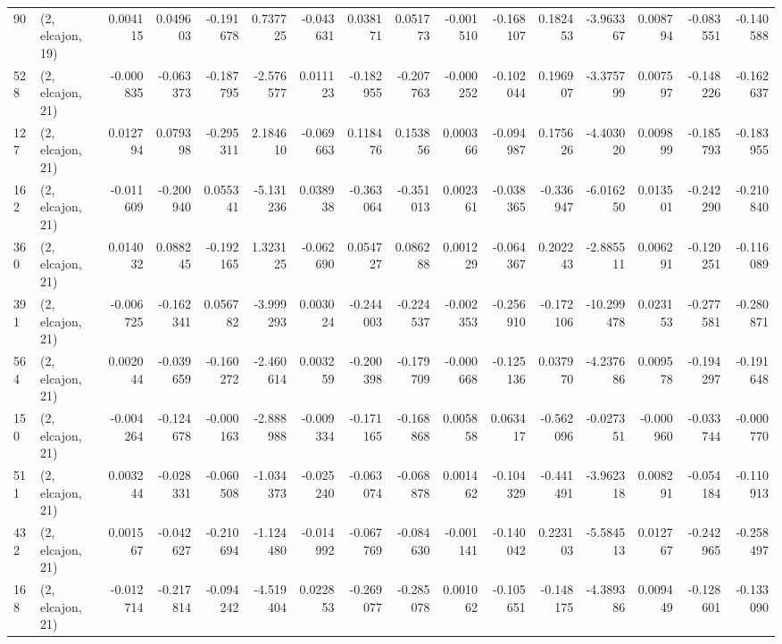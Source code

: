 \begin{tabular}{llrrrrrrrrrrrrrr}
90  &  (2, elcajon, 19) &   0.004115 &  0.049603 & -0.191678 &    0.737725 & -0.043631 &   0.038171 &  0.051773 & -0.001510 & -0.168107 &  0.182453 &   -3.963367 &  0.008794 & -0.083551 & -0.140588 \\
528 &  (2, elcajon, 21) &  -0.000835 & -0.063373 & -0.187795 &   -2.576577 &  0.011123 &  -0.182955 & -0.207763 & -0.000252 & -0.102044 &  0.196907 &   -3.375799 &  0.007597 & -0.148226 & -0.162637 \\
127 &  (2, elcajon, 21) &   0.012794 &  0.079398 & -0.295311 &    2.184610 & -0.069663 &   0.118476 &  0.153856 &  0.000366 & -0.094987 &  0.175626 &   -4.403020 &  0.009899 & -0.185793 & -0.183955 \\
162 &  (2, elcajon, 21) &  -0.011609 & -0.200940 &  0.055341 &   -5.131236 &  0.038938 &  -0.363064 & -0.351013 &  0.002361 & -0.038365 & -0.336947 &   -6.016250 &  0.013501 & -0.242290 & -0.210840 \\
360 &  (2, elcajon, 21) &   0.014032 &  0.088245 & -0.192165 &    1.323125 & -0.062690 &   0.054727 &  0.086288 &  0.001229 & -0.064367 &  0.202243 &   -2.885511 &  0.006291 & -0.120251 & -0.116089 \\
391 &  (2, elcajon, 21) &  -0.006725 & -0.162341 &  0.056782 &   -3.999293 &  0.003024 &  -0.244003 & -0.224537 & -0.002353 & -0.256910 & -0.172106 &  -10.299478 &  0.023153 & -0.277581 & -0.280871 \\
564 &  (2, elcajon, 21) &   0.002044 & -0.039659 & -0.160272 &   -2.460614 &  0.003259 &  -0.200398 & -0.179709 & -0.000668 & -0.125136 &  0.037970 &   -4.237686 &  0.009578 & -0.194297 & -0.191648 \\
150 &  (2, elcajon, 21) &  -0.004264 & -0.124678 & -0.000163 &   -2.888988 & -0.009334 &  -0.171165 & -0.168868 &  0.005858 &  0.063417 & -0.562096 &   -0.027351 & -0.000960 & -0.033744 & -0.000770 \\
511 &  (2, elcajon, 21) &   0.003244 & -0.028331 & -0.060508 &   -1.034373 & -0.025240 &  -0.063074 & -0.068878 &  0.001462 & -0.104329 & -0.441491 &   -3.962318 &  0.008291 & -0.054184 & -0.110913 \\
432 &  (2, elcajon, 21) &   0.001567 & -0.042627 & -0.210694 &   -1.124480 & -0.014992 &  -0.067769 & -0.084630 & -0.001141 & -0.140042 &  0.223103 &   -5.584513 &  0.012767 & -0.242965 & -0.258497 \\
168 &  (2, elcajon, 21) &  -0.012714 & -0.217814 & -0.094242 &   -4.519404 &  0.022853 &  -0.269077 & -0.285078 &  0.001062 & -0.105651 & -0.148175 &   -4.389386 &  0.009449 & -0.128601 & -0.133090 \\

\end{tabular}

